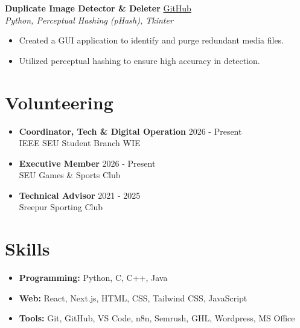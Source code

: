 \documentclass[a4paper,10pt]{article}
\begin{document}
\vspace{6pt}

\noindent \textbf{Duplicate Image Detector \& Deleter} \hfill \href{https://github.com/Mahi-Hamid-Ratul/Python-Duplicate-Image-Detector}{GitHub} \\
\textit{Python, Perceptual Hashing (pHash), Tkinter}
\begin{itemize}[noitemsep, topsep=0pt]
    \item Created a GUI application to identify and purge redundant media files.
    \item Utilized perceptual hashing to ensure high accuracy in detection.
\end{itemize}

\section*{Volunteering}
\begin{itemize}[noitemsep]
    \item \textbf{Coordinator, Tech \& Digital Operation} \hfill 2026 - Present \\
    IEEE SEU Student Branch WIE
    \vspace{4pt}
    \item \textbf{Executive Member} \hfill 2026 - Present \\
    SEU Games \& Sports Club
    \vspace{4pt}
    \item \textbf{Technical Advisor} \hfill 2021 - 2025 \\
    Sreepur Sporting Club
\end{itemize}

\section*{Skills}
\begin{itemize}[noitemsep]
    \item \textbf{Programming:} Python, C, C++, Java
    \item \textbf{Web:} React, Next.js, HTML, CSS, Tailwind CSS, JavaScript
    \item \textbf{Tools:} Git, GitHub, VS Code, n8n, Semrush, GHL, Wordpress, MS Office
\end{itemize}

\end{document}
